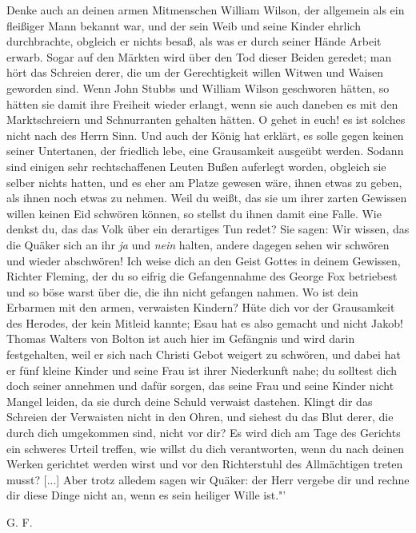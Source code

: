 Denke auch an deinen armen Mitmenschen William Wilson,
der allgemein als ein fleißiger Mann bekannt war, und der sein
Weib und seine Kinder ehrlich durchbrachte, obgleich er nichts besaß, 
als was er durch seiner Hände Arbeit erwarb. Sogar auf
den Märkten wird über den Tod dieser Beiden geredet; man hört
das Schreien derer, die um der Gerechtigkeit willen Witwen und
Waisen geworden sind. Wenn John Stubbs und William Wilson 
geschworen hätten, so hätten sie damit ihre Freiheit wieder
erlangt, wenn sie auch daneben es mit den Marktschreiern und
Schnurranten gehalten hätten. O gehet in euch! es ist solches
nicht nach des Herrn Sinn. Und auch der König hat erklärt, es
solle gegen keinen seiner Untertanen, der friedlich lebe, eine 
Grausamkeit ausgeübt werden. Sodann sind einigen sehr rechtschaffenen
Leuten Bußen auferlegt worden, obgleich sie selber nichts hatten,
und es eher am Platze gewesen wäre, ihnen etwas zu geben, als
ihnen noch etwas zu nehmen. Weil du weißt, das sie um ihrer zarten
Gewissen willen keinen Eid schwören können, so stellst du ihnen damit 
eine Falle. Wie denkst du, das das Volk über ein derartiges
Tun redet? Sie sagen: Wir wissen, das die Quäker sich an ihr
\textit{ja} und \textit{nein} halten, andere dagegen sehen 
wir schwören und wieder abschwören! 
Ich weise dich an den Geist Gottes in deinem Gewissen, 
Richter Fleming, der du so eifrig die Gefangennahme
des George Fox betriebest und so böse warst über die, die ihn
nicht gefangen nahmen. Wo ist dein Erbarmen mit den armen,
verwaisten Kindern? Hüte dich vor der Grausamkeit des Herodes,
der kein Mitleid kannte; Esau hat es also gemacht und nicht
Jakob! Thomas Walters 
von Bolton ist auch hier im Gefängnis 
und wird darin festgehalten, weil er sich nach Christi Gebot
weigert zu schwören, und dabei hat er fünf kleine Kinder und seine
Frau ist ihrer Niederkunft nahe; du solltest dich doch seiner 
annehmen und dafür sorgen, das seine Frau und seine Kinder nicht
Mangel leiden, da sie durch deine Schuld verwaist dastehen.
Klingt dir das Schreien der Verwaisten nicht in den Ohren, und
siehest du das Blut derer, die durch dich umgekommen sind, nicht
vor dir? Es wird dich am Tage des Gerichts ein schweres Urteil 
treffen, wie willst du dich verantworten, wenn du nach deinen
Werken gerichtet werden wirst und vor den Richterstuhl des
Allmächtigen treten musst? [...] Aber trotz alledem sagen wir
Quäker: der Herr vergebe dir und rechne dir diese Dinge nicht
an, wenn es sein heiliger Wille ist."' 
\begin{flushright}G. F.\end{flushright}

